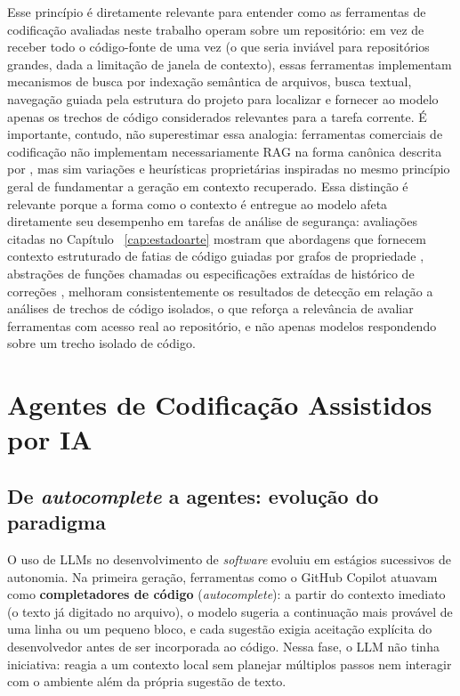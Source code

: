 Esse princípio é diretamente relevante para entender como as ferramentas de codificação avaliadas neste trabalho operam sobre um repositório: em vez de receber todo o código-fonte de uma vez (o que seria inviável para repositórios grandes, dada a limitação de janela de contexto), essas ferramentas implementam mecanismos de busca por indexação semântica de arquivos, busca textual, navegação guiada pela estrutura do projeto para localizar e fornecer ao modelo apenas os trechos de código considerados relevantes para a tarefa corrente. É importante, contudo, não superestimar essa analogia: ferramentas comerciais de codificação não implementam necessariamente RAG na forma canônica descrita por , mas sim variações e heurísticas proprietárias inspiradas no mesmo princípio geral de fundamentar a geração em contexto recuperado. Essa distinção é relevante porque a forma como o contexto é entregue ao modelo afeta diretamente seu desempenho em tarefas de análise de segurança: avaliações citadas no Capítulo ~\ref{cap:estadoarte} mostram que abordagens que fornecem contexto estruturado de fatias de código guiadas por grafos de propriedade \cite{Lekssays2025LLMxCPG}, abstrações de funções chamadas \cite{Yang2025ContextVD} ou especificações extraídas de histórico de correções \cite{Zhu2025SpecGuidedVD}, melhoram consistentemente os resultados de detecção em relação a análises de trechos de código isolados, o que reforça a relevância de avaliar ferramentas com acesso real ao repositório, e não apenas modelos respondendo sobre um trecho isolado de código.


\section{Agentes de Codificação Assistidos por IA}\label{sec:agentes-codificacao}
\subsection{De \textit{autocomplete} a agentes: evolução do paradigma}\label{subsec:evolucao-agentes}
O uso de LLMs no desenvolvimento de \textit{software} evoluiu em estágios sucessivos de autonomia. Na primeira geração, ferramentas como o GitHub Copilot atuavam como \textbf{completadores de código} (\textit{autocomplete}): a partir do contexto imediato (o texto já digitado no arquivo), o modelo sugeria a continuação mais provável de uma linha ou um pequeno bloco, e cada sugestão exigia aceitação explícita do desenvolvedor antes de ser incorporada ao código. Nessa fase, o LLM não tinha iniciativa: reagia a um contexto local sem planejar múltiplos passos nem interagir com o ambiente além da própria sugestão de texto.

